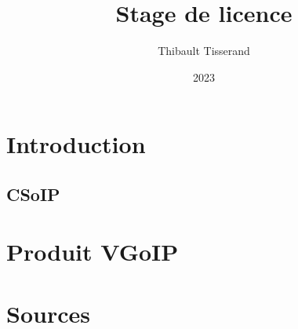 \documentclass{beamer}
\title{Stage de licence}
\author{Thibault Tisserand}
\institute{Université de Lille}
\date{2023}
\begin{document}
\titlepage



\section{Introduction}


\subsection{CSoIP}


\section{Produit VGoIP}


\section{Sources}

\end{document}
